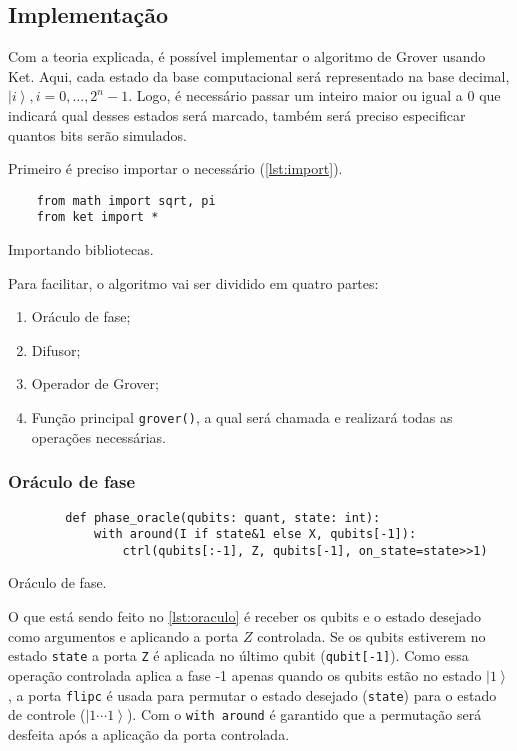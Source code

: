 \subsection{Implementação}\label{subsec:implementacao}

Com a teoria explicada, é possível implementar o algoritmo de Grover usando Ket.
Aqui, cada estado da base computacional será representado na base decimal, \(\left| i \right\rangle, i = 0, \dots, 2^n - 1\).
Logo, é necessário passar um inteiro maior ou igual a 0 que indicará qual desses estados será marcado, também será preciso especificar quantos bits serão simulados.

Primeiro é preciso importar o necessário (\autoref{lst:import}).

\begin{listing}[!htb]
    \begin{verbatim}
    from math import sqrt, pi
    from ket import *
    \end{verbatim}
    \caption{Importando bibliotecas.}
    \label{lst:import}
\end{listing}

Para facilitar, o algoritmo vai ser dividido em quatro partes:

\begin{enumerate}
\tightlist
\item
  Oráculo de fase;
\item
  Difusor;
\item
  Operador de Grover;
\item
  Função principal \texttt{grover()}, a qual será chamada e realizará
  todas as operações necessárias.
\end{enumerate}

\subsubsection{Oráculo de fase}\label{subsubsec:oraculo-de-fase2}

\begin{listing}[!htb]
    \begin{verbatim}
        def phase_oracle(qubits: quant, state: int):
            with around(I if state&1 else X, qubits[-1]):
                ctrl(qubits[:-1], Z, qubits[-1], on_state=state>>1)
    \end{verbatim}
    \caption{Oráculo de fase.}
    \label{lst:oraculo}
\end{listing}

O que está sendo feito no \autoref{lst:oraculo} é receber os qubits e o estado desejado como argumentos e aplicando a porta \(Z\) controlada.
Se os qubits estiverem no estado \texttt{state} a porta \texttt{Z} é aplicada
no último qubit (\texttt{qubit{[}-1{]}}).
Como essa operação controlada aplica a fase -1 apenas quando os qubits estão no estado \(\left|1\right>\), a porta \texttt{flipc} é usada para permutar o estado desejado (\texttt{state}) para o estado de controle (\(\left|1\cdots1\right>\)).
Com o \texttt{with\ around} é garantido que a permutação será desfeita após a aplicação da porta controlada.

